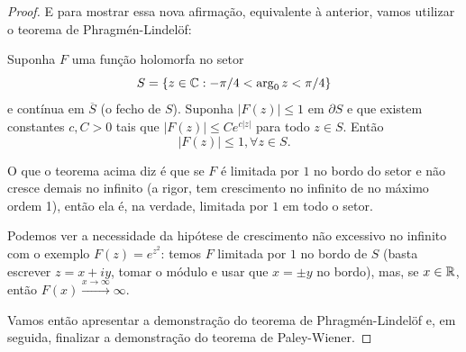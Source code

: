 \begin{proof}
            E para mostrar essa nova afirmação, equivalente à anterior,
            vamos utilizar o teorema de Phragmén-Lindelöf:
            \begin{teorema}
                Suponha $F$ uma função holomorfa no setor
                \begin{equation*}
                    S = \{ z\in\mathbb{C} : -\pi/4 < \arg_0 z < \pi/4 \}
                \end{equation*}
                e contínua em $\overline{S}$ (o fecho de $S$). Suponha
                $|F(z)| \leq 1$ em $\partial S$ e que existem constantes
                $c,C>0$ tais que $|F(z)| \leq Ce^{c|z|}$ para todo $z\in S$.
                Então
                \begin{equation*}
                    |F(z)| \leq 1, \forall z\in S.
                \end{equation*}
            \end{teorema}
            O que o teorema acima diz é que se $F$ é limitada por $1$ no
            bordo do setor e não cresce demais no infinito (a rigor, tem
            crescimento no infinito de no máximo ordem 1), então ela é,
            na verdade, limitada por $1$ em todo o setor.
            
            Podemos ver a necessidade da hipótese de crescimento não
            excessivo no infinito com o exemplo $F(z) = e^{z^2}$:
            temos $F$ limitada por $1$ no bordo de $S$ (basta escrever
            $z = x+iy$, tomar o módulo e usar que $x=\pm y$ no bordo),
            mas, se $x\in\mathbb{R}$, então $F(x)\xrightarrow{x\to\infty} \infty$.
            
            Vamos então apresentar a demonstração do teorema de
            Phragmén-Lindelöf e, em seguida, finalizar a demonstração do
            teorema de Paley-Wiener.
            

\end{proof}
